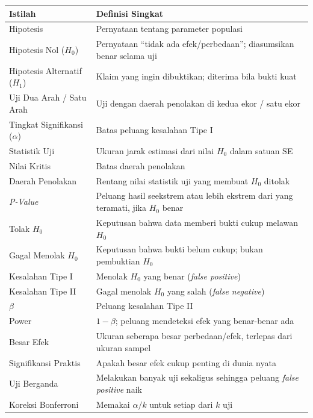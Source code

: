 \documentclass[
  indonesian,
  letterpaper,
]{book}
\newcounter{none} %
\begin{document}
{\def\LTcaptype{none} %
\begin{longtable}[]{@{}
  >{\raggedright\arraybackslash}p{}
  >{\raggedright\arraybackslash}p{}@{}}
\toprule\noalign{}
\begin{minipage}[b]{\linewidth}\raggedright
Istilah
\end{minipage} & \begin{minipage}[b]{\linewidth}\raggedright
Definisi Singkat
\end{minipage} \\
\midrule\noalign{}
\endhead
\bottomrule\noalign{}
\endlastfoot
Hipotesis & Pernyataan tentang parameter populasi \\
Hipotesis Nol (\(H_0\)) & Pernyataan ``tidak ada efek/perbedaan'';
diasumsikan benar selama uji \\
Hipotesis Alternatif (\(H_1\)) & Klaim yang ingin dibuktikan; diterima
bila bukti kuat \\
Uji Dua Arah / Satu Arah & Uji dengan daerah penolakan di kedua ekor /
satu ekor \\
Tingkat Signifikansi (\(\alpha\)) & Batas peluang kesalahan Tipe I \\
Statistik Uji & Ukuran jarak estimasi dari nilai \(H_0\) dalam satuan
SE \\
Nilai Kritis & Batas daerah penolakan \\
Daerah Penolakan & Rentang nilai statistik uji yang membuat \(H_0\)
ditolak \\
\emph{P-Value} & Peluang hasil seekstrem atau lebih ekstrem dari yang
teramati, jika \(H_0\) benar \\
Tolak \(H_0\) & Keputusan bahwa data memberi bukti cukup melawan
\(H_0\) \\
Gagal Menolak \(H_0\) & Keputusan bahwa bukti belum cukup; bukan
pembuktian \(H_0\) \\
Kesalahan Tipe I & Menolak \(H_0\) yang benar (\emph{false positive}) \\
Kesalahan Tipe II & Gagal menolak \(H_0\) yang salah (\emph{false
negative}) \\
\(\beta\) & Peluang kesalahan Tipe II \\
Power & \(1-\beta\); peluang mendeteksi efek yang benar-benar ada \\
Besar Efek & Ukuran seberapa besar perbedaan/efek, terlepas dari ukuran
sampel \\
Signifikansi Praktis & Apakah besar efek cukup penting di dunia nyata \\
Uji Berganda & Melakukan banyak uji sekaligus sehingga peluang
\emph{false positive} naik \\
Koreksi Bonferroni & Memakai \(\alpha/k\) untuk setiap dari \(k\) uji \\
\end{longtable}
}
\end{document}

